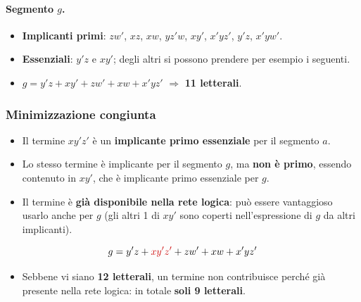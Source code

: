 \documentclass[12pt, a4paper]{article}
\begin{document}
\paragraph{Segmento $g$.}
\begin{itemize}
    \item \textbf{Implicanti primi}: $zw'$, $xz$, $xw$, $yz'w$, $xy'$, $x'yz'$, $y'z$, $x'yw'$.
    \item \textbf{Essenziali}: $y'z$ e $xy'$; degli altri si possono prendere per esempio i seguenti.
    \item $g = y'z + xy' + zw' + xw + x'yz'$ \quad $\Rightarrow$ \textbf{11 letterali}.
\end{itemize}

\subsubsection{Minimizzazione congiunta}
\begin{itemize}
    \item Il termine $xy'z'$ è un \textbf{implicante primo essenziale} per il segmento $a$.
    \item Lo stesso termine è implicante per il segmento $g$, ma \textbf{non è primo}, essendo contenuto in $xy'$, che è implicante primo essenziale per $g$.
    \item Il termine è \textbf{già disponibile nella rete logica}: può essere vantaggioso usarlo anche per $g$ (gli altri 1 di $xy'$ sono coperti nell'espressione di $g$ da altri implicanti).
\end{itemize}
\[ g = y'z + \textcolor{red!80!black}{xy'z'} + zw' + xw + x'yz' \]
\begin{itemize}
    \item Sebbene vi siano \textbf{12 letterali}, un termine non contribuisce perché già presente nella rete logica: in totale \textbf{soli 9 letterali}.
\end{itemize}
\end{document}
